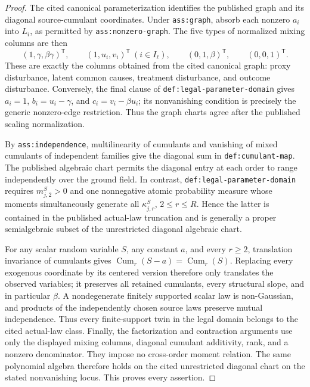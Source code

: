 \documentclass{article}
\begin{document}
\begin{proof}
The cited canonical parameterization identifies the published graph and its diagonal source-cumulant coordinates.  Under \texttt{ass:graph}, absorb each nonzero \(a_i\) into \(L_i\), as permitted by \texttt{ass:nonzero-graph}.  The five types of normalized mixing columns are then
\[
 (1,\gamma,\beta\gamma)^{\mathsf T},\qquad
 (1,u_i,v_i)^{\mathsf T}\ (i\in I_\ell),\qquad
 (0,1,\beta)^{\mathsf T},\qquad (0,0,1)^{\mathsf T}.
\]
These are exactly the columns obtained from the cited canonical graph: proxy disturbance, latent common causes, treatment disturbance, and outcome disturbance.  Conversely, the final clause of \texttt{def:legal-parameter-domain} gives \(a_i=1\), \(b_i=u_i-\gamma\), and \(c_i=v_i-\beta u_i\); its nonvanishing condition is precisely the generic nonzero-edge restriction.  Thus the graph charts agree after the published scaling normalization.

By \texttt{ass:independence}, multilinearity of cumulants and vanishing of mixed cumulants of independent families give the diagonal sum in \texttt{def:cumulant-map}.  The published algebraic chart permits the diagonal entry at each order to range independently over the ground field.  In contrast, \texttt{def:legal-parameter-domain} requires \(m^S_{j,2}>0\) and one nonnegative atomic probability measure whose moments simultaneously generate all \(\kappa^S_{j,r}\), \(2\le r\le R\).  Hence the latter is contained in the published actual-law truncation and is generally a proper semialgebraic subset of the unrestricted diagonal algebraic chart.

For any scalar random variable \(S\), any constant \(a\), and every \(r\ge2\), translation invariance of cumulants gives \(\operatorname{Cum}_r(S-a)=\operatorname{Cum}_r(S)\).  Replacing every exogenous coordinate by its centered version therefore only translates the observed variables; it preserves all retained cumulants, every structural slope, and in particular \(\beta\).  A nondegenerate finitely supported scalar law is non-Gaussian, and products of the independently chosen source laws preserve mutual independence.  Thus every finite-support twin in the legal domain belongs to the cited actual-law class.  Finally, the factorization and contraction arguments use only the displayed mixing columns, diagonal cumulant additivity, rank, and a nonzero denominator.  They impose no cross-order moment relation.  The same polynomial algebra therefore holds on the cited unrestricted diagonal chart on the stated nonvanishing locus.  This proves every assertion.
\end{proof}
\end{document}
